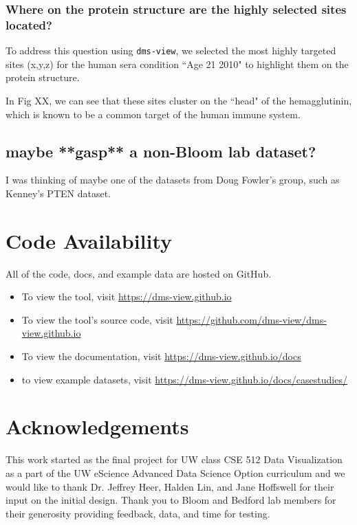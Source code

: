 \subsubsection{Where on the protein structure are the highly selected sites located?}

To address this question using \texttt{dms-view}, we selected the most highly targeted sites (x,y,z) for the human sera condition ``Age 21 2010" to highlight them on the protein structure.

In Fig XX, we can see that these sites cluster on the ``head" of the hemagglutinin, which is known to be a common target of the human immune system.

\subsection{maybe **gasp** a non-Bloom lab dataset?}

I was thinking of maybe one of the datasets from Doug Fowler's group, such as Kenney's PTEN dataset.

\section{Code Availability}

All of the code, docs, and example data are hosted on GitHub.

\begin{itemize}
  \item To view the tool, visit \url{https://dms-view.github.io}
  \item To view the tool's source code, visit \url{https://github.com/dms-view/dms-view.github.io}
  \item To view the documentation, visit \url{https://dms-view.github.io/docs}
  \item to view example datasets, visit \url{https://dms-view.github.io/docs/casestudies/}
\end{itemize}

\section{Acknowledgements}

This work started as the final project for UW class CSE 512 Data Visualization as a part of the UW eScience Advanced Data Science Option curriculum and we would like to thank Dr. Jeffrey Heer, Halden Lin, and Jane Hoffswell for their input on the initial design.
Thank you to Bloom and Bedford lab members for their generosity providing feedback, data, and time for testing.
